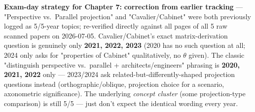 \documentclass[12pt, a4paper]{article}
\newenvironment{notesbox}{\begin{mdframed}[style=notesframe]}{\end{mdframed}}
\begin{document}
\begin{notesbox}
\textbf{Exam-day strategy for Chapter 7:} \textbf{correction from earlier tracking} --- "Perspective vs.\ Parallel projection" and "Cavalier/Cabinet" were both previously logged as 5/5-year topics; re-verified directly against all pages of all 5 raw scanned papers on 2026-07-05. Cavalier/Cabinet's exact matrix-derivation question is genuinely only \textbf{2021, 2022, 2023} (2020 has no such question at all; 2024 only asks for "properties of Cabinet" qualitatively, no $\theta$ given). The classic "distinguish perspective vs.\ parallel + architects/engineers" phrasing is \textbf{2020, 2021, 2022} only --- 2023/2024 ask related-but-differently-shaped projection questions instead (orthographic/oblique, projection choice for a scenario, axonometric significance). The underlying \emph{concept cluster} (some projection-type comparison) is still 5/5 --- just don't expect the identical wording every year.
\end{notesbox}
\end{document}
